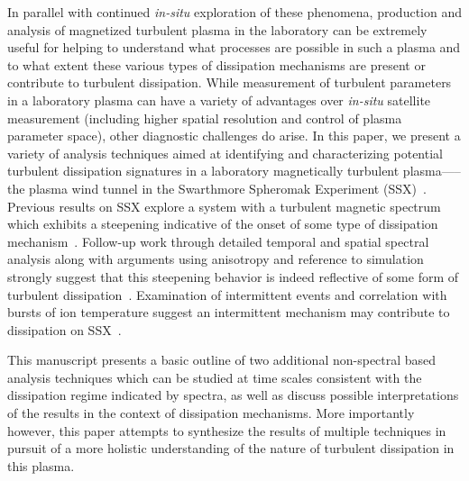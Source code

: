 \documentclass[aip,pop,amsmath,amssymb,preprint,superscriptaddress]{revtex4-1} %
\begin{document}
In parallel with continued \textit{in-situ} exploration of these phenomena, production and analysis of magnetized turbulent plasma in the laboratory can be extremely useful for helping to understand what processes are possible in such a plasma and to what extent these various types of dissipation mechanisms are present or contribute to turbulent dissipation. While measurement of turbulent parameters in a laboratory plasma can have a variety of advantages over \textit{in-situ} satellite measurement (including higher spatial resolution and control of plasma parameter space), other diagnostic challenges do arise.  In this paper, we present a variety of analysis techniques aimed at identifying and characterizing potential turbulent dissipation signatures in a laboratory magnetically turbulent plasma—--the plasma wind tunnel in the Swarthmore Spheromak Experiment (SSX)~\cite{brown2014,brown2015a}. Previous results on SSX explore a system with a turbulent magnetic spectrum which exhibits a steepening indicative of the onset of some type of dissipation mechanism~\cite{schaffner2014a}. Follow-up work through detailed temporal and spatial spectral analysis along with arguments using anisotropy and reference to simulation strongly suggest that this steepening behavior is indeed reflective of some form of turbulent dissipation~\cite{schaffner2014c}. Examination of intermittent events and correlation with bursts of ion temperature suggest an intermittent mechanism may contribute to dissipation on SSX~\cite{schaffner2014b}. 

This manuscript presents a basic outline of two additional non-spectral based analysis techniques which can be studied at time scales consistent with the dissipation regime indicated by spectra, as well as discuss possible interpretations of the results in the context of dissipation mechanisms. More importantly however, this paper attempts to synthesize the results of multiple techniques in pursuit of a more holistic understanding of the nature of turbulent dissipation in this plasma.
\end{document}
